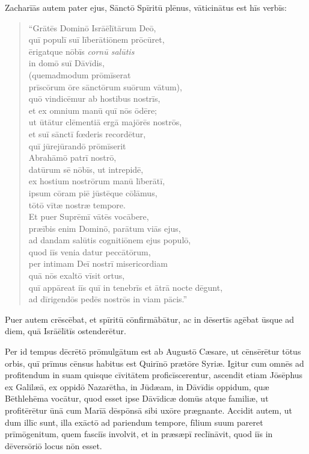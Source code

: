 \Versus Zacharīās autem pater ejus, Sānctō Spīritū plēnus, vāticinātus est hīs verbīs:
\begin{verse}
\begin{patverse*}
\Versus ``Grātēs Dominō Isrāēlītārum Deō,\\
quī populī suī līberātiōnem prōcūret,\\
\Versus ērigatque nōbīs \emph{cornū salūtis} \\
in domō suī Dāvīdis,\\
\Versus (quemadmodum prōmīserat\\
prīscōrum ōre sānctōrum suōrum vātum),\\
\Versus quō vindicēmur ab hostibus nostrīs,\\
et ex omnium manū quī nōs ōdēre;\\
\Versus ut ūtātur clēmentiā ergā majōrēs nostrōs,\\
et suī sānctī fœderis recordētur,\\
\Versus quī jūrejūrandō prōmīserit\\
Abrahāmō patrī nostrō,\\
\Versus datūrum sē nōbīs, ut intrepidē,\\
ex hostium nostrōrum manū līberātī,\\
\Versus ipsum cōram piē jūstēque cōlāmus,\\
tōtō vītæ nostræ tempore.\\
\medskip
\Versus Et puer Suprēmī vātēs vocābere,\\
præībis enim Dominō, parātum viās ejus,\\
\Versus ad dandam salūtis cognitiōnem ejus populō,\\
quod iīs venia datur peccātōrum,\\
\Versus per intimam Deī nostrī misericordiam\\
quā nōs exaltō vīsit ortus,\\
\Versus quī appāreat iīs quī in tenebrīs et ātrā nocte dēgunt,\\
ad dīrigendōs pedēs nostrōs in viam pācis.''
\end{patverse*}
\end{verse}

\Versus Puer autem crēscēbat, et spīritū cōnfirmābātur, ac in dēsertīs agēbat ūsque ad diem, quā Isrāēlītīs ostenderētur.



\Caput
\Versus Per id tempus dēcrētō prōmulgātum est ab Augustō Cæsare, ut cēnsērētur tōtus orbis,
\Versus quī prīmus cēnsus habitus est Quirīnō prætōre Syriæ.
\Versus Igitur cum omnēs ad profitendum in suam quisque cīvitātem proficīscerentur,
\Versus ascendit etiam Jōsēphus ex Galilæā, ex oppidō Nazarētha, in Jūdæam, in Dāvīdis oppidum, quæ Bēthlehēma vocātur, quod esset ipse Dāvīdicæ domūs atque familiæ,
\Versus ut profitērētur ūnā cum Marīā dēspōnsā sibi uxōre prægnante.
\Versus Accidit autem, ut dum illīc sunt, illa exāctō ad pariendum tempore,
\Versus fīlium suum pareret prīmōgenitum, quem fasciīs involvit, et in præsæpī reclīnāvit, quod iīs in dēversōriō locus nōn esset.

